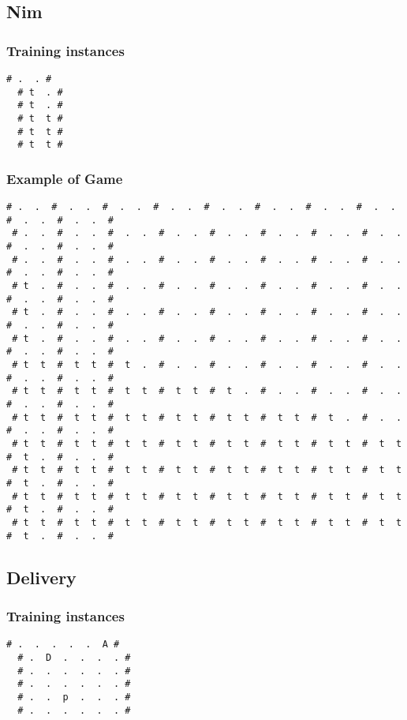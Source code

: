 \documentclass[a4paper]{article}
\begin{document}
\subsection{Nim}

\subsubsection{Training instances}
\begin{Verbatim}[fontsize=\footnotesize]
  # .  . #
  # t  . #
  # t  . #
  # t  t #
  # t  t #
  # t  t #
\end{Verbatim}


\subsubsection{Example of Game}
\begin{Verbatim}[fontsize=\footnotesize]
 # .  .  #  .  .  #  .  .  #  .  .  #  .  .  #  .  .  #  .  .  #  .  .  #  .  .  #  .  .  #
 # .  .  #  .  .  #  .  .  #  .  .  #  .  .  #  .  .  #  .  .  #  .  .  #  .  .  #  .  .  #
 # .  .  #  .  .  #  .  .  #  .  .  #  .  .  #  .  .  #  .  .  #  .  .  #  .  .  #  .  .  #
 # t  .  #  .  .  #  .  .  #  .  .  #  .  .  #  .  .  #  .  .  #  .  .  #  .  .  #  .  .  #
 # t  .  #  .  .  #  .  .  #  .  .  #  .  .  #  .  .  #  .  .  #  .  .  #  .  .  #  .  .  #
 # t  .  #  .  .  #  .  .  #  .  .  #  .  .  #  .  .  #  .  .  #  .  .  #  .  .  #  .  .  #
 # t  t  #  t  t  #  t  .  #  .  .  #  .  .  #  .  .  #  .  .  #  .  .  #  .  .  #  .  .  #
 # t  t  #  t  t  #  t  t  #  t  t  #  t  .  #  .  .  #  .  .  #  .  .  #  .  .  #  .  .  #
 # t  t  #  t  t  #  t  t  #  t  t  #  t  t  #  t  t  #  t  .  #  .  .  #  .  .  #  .  .  #
 # t  t  #  t  t  #  t  t  #  t  t  #  t  t  #  t  t  #  t  t  #  t  t  #  t  .  #  .  .  #
 # t  t  #  t  t  #  t  t  #  t  t  #  t  t  #  t  t  #  t  t  #  t  t  #  t  .  #  .  .  #
 # t  t  #  t  t  #  t  t  #  t  t  #  t  t  #  t  t  #  t  t  #  t  t  #  t  .  #  .  .  #
 # t  t  #  t  t  #  t  t  #  t  t  #  t  t  #  t  t  #  t  t  #  t  t  #  t  .  #  .  .  #
\end{Verbatim}

\subsection{Delivery}

\subsubsection{Training instances}
\begin{Verbatim}[fontsize=\footnotesize]
  # .  .  .  .  .  A #
  # .  D  .  .  .  . #
  # .  .  .  .  .  . #
  # .  .  .  .  .  . #
  # .  .  p  .  .  . #
  # .  .  .  .  .  . #
\end{Verbatim}
\end{document}
